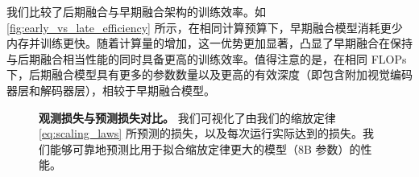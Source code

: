 

我们比较了后期融合与早期融合架构的训练效率。如 \cref{fig:early_vs_late_efficiency} 所示，在相同计算预算下，早期融合模型消耗更少内存并训练更快。随着计算量的增加，这一优势更加显著，凸显了早期融合在保持与后期融合相当性能的同时具备更高的训练效率。值得注意的是，在相同 FLOPs 下，后期融合模型具有更多的参数数量以及更高的有效深度（即包含附加视觉编码器层和解码器层），相较于早期融合模型。

\begin{figure*}[h!]
    \centering
    \captionsetup{type=figure}

    \begin{minipage}[t]{0.55\linewidth}
        \centering
        
        \caption{\textbf{观测损失与预测损失对比。} 我们可视化了由我们的缩放定律 \cref{eq:scaling_laws} 所预测的损失，以及每次运行实际达到的损失。我们能够可靠地预测比用于拟合缩放定律更大的模型（8B 参数）的性能。}
        \label{fig:observed_vs_predicted_loss_extrapolation}
    \end{minipage}
    \hfill
    \begin{minipage}[t]{0.4\linewidth}
        \begin{minipage}[t]{\linewidth}
            \centering
            \vspace{-5.5cm}
            \setlength{\tabcolsep}{8pt}
            \renewcommand{\arraystretch}{1}
            \label{tab:scaling_laws_errors_main}
        \end{minipage}


\end{minipage}
\end{figure*}
